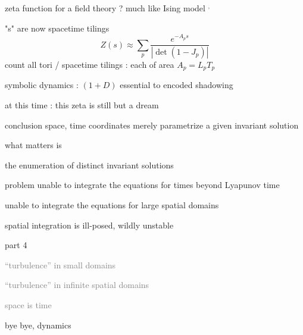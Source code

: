 

\begin{frame}{zeta function for a field theory ? much like Ising model
    $^,$
}
\begin{block}{"\po s" are now spacetime tilings}
\[
Z(s) \approx
\sum_{p} \frac{e^{-A_p s}}
              {\left|\det(1-J_p)\right|}
\]
count all tori / spacetime tilings :
each of area $A_p = L_p T_p$
\end{block}
\begin{block}{symbolic dynamics : $(1+D)$\dmn}
essential to encoded shadowing
\end{block}

\vfill
at this time : this zeta is still but a dream
\end{frame}

\begin{frame}{conclusion}
space, time coordinates merely parametrize a given invariant solution

\bigskip

what matters is

\vfill

{\Large
the enumeration of distinct invariant solutions
                  }
\end{frame}

\begin{frame}{problem}
unable to integrate the equations for times beyond Lyapunov time


\vfill

unable to integrate the equations for large spatial domains

\bigskip

{\Large
spatial integration is ill-posed, wildly  unstable
                  }
\end{frame}


\begin{frame}{part 4}
\begin{enumerate}
              \item
    \textcolor{gray}{\small
``turbulence'' in small domains
              \item
``turbulence'' in infinite spatial domains
              \item
space is time
    }
              \item
    {\Large
bye bye, dynamics
    }
            \end{enumerate}
\end{frame}

